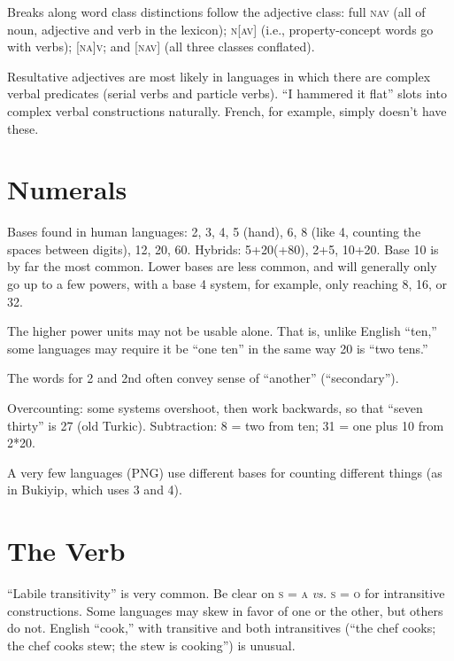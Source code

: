 \documentclass[11pt]{article}
\newcommand{\I}[1]{\textsc{#1}}   %
\begin{document}
Breaks along word class distinctions follow the adjective class: full
\I{nav} (all of noun, adjective and verb in the lexicon); \I{n[av]}
(i.e., property-concept words go with verbs); \I{[na]v}; and \I{[nav]}
(all three classes conflated).

Resultative adjectives are most likely in languages in which there are
complex verbal predicates (serial verbs and particle verbs). ``I
hammered it flat'' slots into complex verbal constructions naturally.
French, for example, simply doesn't have these.


\section{Numerals}
Bases found in human languages: 2, 3, 4, 5 (hand), 6, 8 (like 4,
counting the spaces between digits), 12, 20, 60.  Hybrids: 5+20(+80),
2+5, 10+20.  Base 10 is by far the most common.  Lower bases are less
common, and will generally only go up to a few powers, with a base 4
system, for example, only reaching 8, 16, or 32.

The higher power units may not be usable alone. That is, unlike
English ``ten,'' some languages may require it be ``one ten'' in the
same way 20 is ``two tens.''

The words for 2 and 2nd often convey sense of ``another''
(``secondary''). 

Overcounting: some systems overshoot, then work backwards, so that
``seven thirty'' is 27 (old Turkic).  Subtraction: 8 = two from ten;
31 = one plus 10 from 2*20.

A very few languages (PNG) use different bases for counting different
things (as in Bukiyip, which uses 3 and 4).


\section{The Verb}
``Labile transitivity'' is very common.  Be clear on \I{s = a}
\textit{vs.} \I{s = o} for intransitive constructions.  Some languages
may skew in favor of one or the other, but others do not.  English
``cook,'' with transitive and both intransitives (``the chef cooks;
the chef cooks stew; the stew is cooking'') is unusual.
\end{document}
